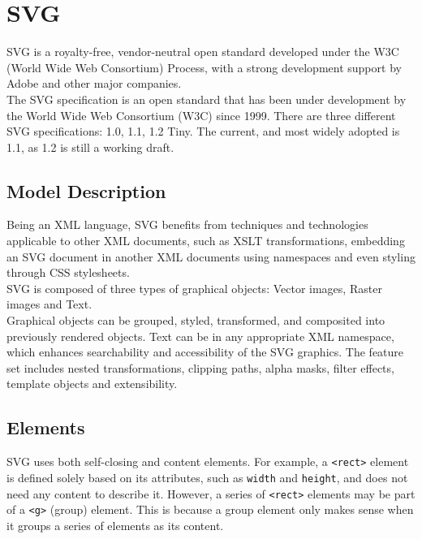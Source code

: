 \documentclass[twocolumn,twoside,10pt,a4paper]{article}
\begin{document}
\section{SVG}

SVG is a royalty-free, vendor-neutral open standard developed under the W3C (World Wide Web Consortium) Process, with a strong development support by Adobe and other major companies.\\
The SVG specification is an open standard that has been under development by the World Wide Web Consortium (W3C) since 1999. There are three different SVG specifications: 1.0, 1.1, 1.2 Tiny. The current, and most widely adopted is 1.1, as 1.2 is still a working draft.\cite{w3c_svg}

\subsection{Model Description}

Being an XML language, SVG benefits from techniques and technologies applicable to other XML documents, such as XSLT transformations, embedding an SVG document in another XML documents using namespaces and even styling through CSS stylesheets.\\

SVG is composed of three types of graphical objects: Vector images, Raster images and Text.\\

Graphical objects can be grouped, styled, transformed, and composited into previously rendered objects. Text can be in any appropriate XML namespace, which enhances searchability and accessibility of the SVG graphics. The feature set includes nested transformations, clipping paths, alpha masks, filter effects, template objects and extensibility.\cite{eisenberg}

\subsection{Elements}

SVG uses both self-closing and content elements. For example, a \verb!<rect>! element is defined solely based on its attributes, such as \verb!width! and \verb!height!, and does not need any content to describe it. However, a series of \verb!<rect>! elements may be part of a \verb!<g>! (group) element. This is because a group element only makes sense when it groups a series of elements as its content.\\
\end{document}
